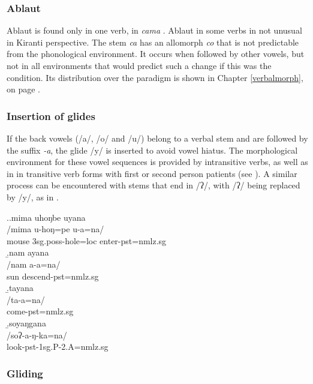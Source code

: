 \subsubsection{Ablaut} 

Ablaut is found only in one verb, in \emph{cama} . Ablaut in some verbs in not unusual in Kiranti perspective. The stem \emph{ca} has an allomorph \emph{co} that is not predictable from the phonological environment. It occurs when followed by other vowels, but not in all environments that would predict such a change if this was the condition.  Its distribution over the paradigm is shown in Chapter \ref{verbalmorph}, on page \pageref{par-cama-pst}.



\subsubsection{Insertion of glides}

If the back vowels (/a/, /o/ and /u/) belong to a verbal stem and are followed by the suffix \emph{-a}, the glide /y/ is inserted to avoid vowel hiatus. The morphological environment for these vowel sequences is provided by intransitive verbs, as well as in  in transitive verb forms with first or second person patients (see \Next). A similar process can  be encountered with stems that end in /ʔ/, with /ʔ/ being replaced by /y/, as in  \Next[d].

\ex.\a.\glll mima uhoŋbe uyana\\
/mima u-hoŋ=pe u-a=na/\\
mouse {\sc 3sg.poss-}hole{\sc =loc}  enter{\sc [3sg]-pst=nmlz.sg}\\
\b.\glll  nam ayana\\
/nam a-a=na/\\
sun descend{\sc [3sg]-pst=nmlz.sg}\\
\b.\glll  tayana\\
/ta-a=na/\\
come{\sc [3sg]-pst=nmlz.sg}\\
\b.\glll  soyaŋgana\\
/soʔ-a-ŋ-ka=na/\\
look{\sc -pst-1sg.P-2.A=nmlz.sg}\\


\subsubsection{Gliding}


